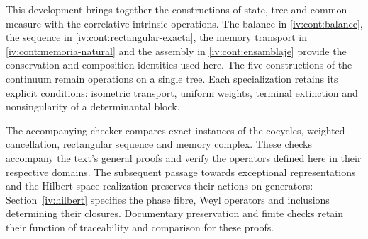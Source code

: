 This development brings together the constructions of state, tree and
common measure with the correlative intrinsic operations. The balance in
\ref{iv:cont:balance}, the sequence in \ref{iv:cont:rectangular-exacta},
the memory transport in \ref{iv:cont:memoria-natural} and the
assembly in \ref{iv:cont:ensamblaje} provide the conservation and
composition identities used here. The five constructions of the continuum
remain operations on a single tree. Each specialization retains its
explicit conditions: isometric transport, uniform weights, terminal
extinction and nonsingularity of a determinantal block.

The accompanying checker compares exact instances of the cocycles, weighted cancellation, rectangular sequence and memory complex. These checks accompany the text's general proofs and verify the operators defined here in their respective domains. The subsequent passage towards exceptional representations and the Hilbert-space realization preserves their actions on generators: Section~\ref{iv:hilbert} specifies the phase fibre, Weyl operators and inclusions determining their closures. Documentary preservation and finite checks retain their function of traceability and comparison for these proofs.
